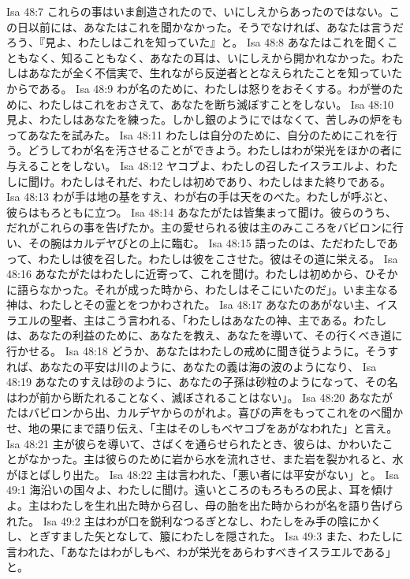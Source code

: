 Isa 48:7  これらの事はいま創造されたので、いにしえからあったのではない。この日以前には、あなたはこれを聞かなかった。そうでなければ、あなたは言うだろう、『見よ、わたしはこれを知っていた』と。
Isa 48:8  あなたはこれを聞くこともなく、知ることもなく、あなたの耳は、いにしえから開かれなかった。わたしはあなたが全く不信実で、生れながら反逆者ととなえられたことを知っていたからである。
Isa 48:9  わが名のために、わたしは怒りをおそくする。わが誉のために、わたしはこれをおさえて、あなたを断ち滅ぼすことをしない。
Isa 48:10  見よ、わたしはあなたを練った。しかし銀のようにではなくて、苦しみの炉をもってあなたを試みた。
Isa 48:11  わたしは自分のために、自分のためにこれを行う。どうしてわが名を汚させることができよう。わたしはわが栄光をほかの者に与えることをしない。
Isa 48:12  ヤコブよ、わたしの召したイスラエルよ、わたしに聞け。わたしはそれだ、わたしは初めであり、わたしはまた終りである。
Isa 48:13  わが手は地の基をすえ、わが右の手は天をのべた。わたしが呼ぶと、彼らはもろともに立つ。
Isa 48:14  あなたがたは皆集まって聞け。彼らのうち、だれがこれらの事を告げたか。主の愛せられる彼は主のみこころをバビロンに行い、その腕はカルデヤびとの上に臨む。
Isa 48:15  語ったのは、ただわたしであって、わたしは彼を召した。わたしは彼をこさせた。彼はその道に栄える。
Isa 48:16  あなたがたはわたしに近寄って、これを聞け。わたしは初めから、ひそかに語らなかった。それが成った時から、わたしはそこにいたのだ」。いま主なる神は、わたしとその霊とをつかわされた。
Isa 48:17  あなたのあがない主、イスラエルの聖者、主はこう言われる、「わたしはあなたの神、主である。わたしは、あなたの利益のために、あなたを教え、あなたを導いて、その行くべき道に行かせる。
Isa 48:18  どうか、あなたはわたしの戒めに聞き従うように。そうすれば、あなたの平安は川のように、あなたの義は海の波のようになり、
Isa 48:19  あなたのすえは砂のように、あなたの子孫は砂粒のようになって、その名はわが前から断たれることなく、滅ぼされることはない」。
Isa 48:20  あなたがたはバビロンから出、カルデヤからのがれよ。喜びの声をもってこれをのべ聞かせ、地の果にまで語り伝え、「主はそのしもべヤコブをあがなわれた」と言え。
Isa 48:21  主が彼らを導いて、さばくを通らせられたとき、彼らは、かわいたことがなかった。主は彼らのために岩から水を流れさせ、また岩を裂かれると、水がほとばしり出た。
Isa 48:22  主は言われた、「悪い者には平安がない」と。
Isa 49:1  海沿いの国々よ、わたしに聞け。遠いところのもろもろの民よ、耳を傾けよ。主はわたしを生れ出た時から召し、母の胎を出た時からわが名を語り告げられた。
Isa 49:2  主はわが口を鋭利なつるぎとなし、わたしをみ手の陰にかくし、とぎすました矢となして、箙にわたしを隠された。
Isa 49:3  また、わたしに言われた、「あなたはわがしもべ、わが栄光をあらわすべきイスラエルである」と。
